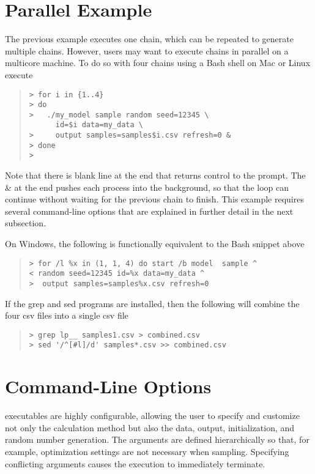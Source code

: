 \section{Parallel Example}

The previous example executes one chain, which can be repeated to 
generate multiple chains. However, users may want to execute chains
in parallel on a multicore machine. To do so with four chains using
a Bash shell on Mac or Linux execute
%
\begin{quote}
\begin{Verbatim}[fontshape=sl,fontsize=\small]
> for i in {1..4}
> do
>   ./my_model sample random seed=12345 \ 
      id=$i data=my_data \
>     output samples=samples$i.csv refresh=0 &
> done
>
\end{Verbatim}
\end{quote}
%
Note that there is blank line at the end that returns control to the
prompt. The \& at the end pushes each process into the background, so
that the loop can continue without waiting for the previous chain to 
finish. This example requires several command-line options that are
explained in further detail in the next subsection. 

On Windows, the following is functionally equivalent to the Bash
snippet above
%
\begin{quote}
\begin{Verbatim}[fontshape=sl,fontsize=\small]
> for /l %x in (1, 1, 4) do start /b model  sample ^
< random seed=12345 id=%x data=my_data ^
>  output samples=samples%x.csv refresh=0
\end{Verbatim}
\end{quote}
%
If the grep and sed programs are installed, then the following will
combine the four csv files into a single csv file
%
\begin{quote}
\begin{Verbatim}[fontshape=sl,fontsize=\small]
> grep lp__ samples1.csv > combined.csv
> sed '/^[#l]/d' samples*.csv >> combined.csv 
\end{Verbatim}
\end{quote}
%
\section{Command-Line Options}\label{stan-command-line-options.section}

\Stan executables are highly configurable, allowing the user to specify
and customize not only the calculation method but also the data, output,
initialization, and random number generation.  The arguments are defined
hierarchically so that, for example, optimization settings are not necessary
when sampling.  Specifying conflicting arguments causes the execution
to immediately terminate.

